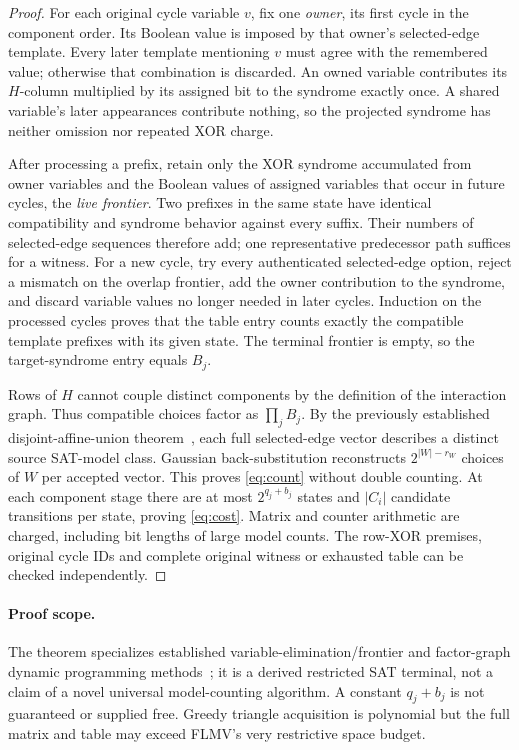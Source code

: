 \documentclass[11pt]{article}
\begin{document}
\begin{proof}
For each original cycle variable $v$, fix one \emph{owner}, its first cycle in the component order. Its Boolean value is imposed by that owner's selected-edge template. Every later template mentioning $v$ must agree with the remembered value; otherwise that combination is discarded. An owned variable contributes its $H$-column multiplied by its assigned bit to the syndrome exactly once. A shared variable's later appearances contribute nothing, so the projected syndrome has neither omission nor repeated XOR charge.

After processing a prefix, retain only the XOR syndrome accumulated from owner variables and the Boolean values of assigned variables that occur in future cycles, the \emph{live frontier}. Two prefixes in the same state have identical compatibility and syndrome behavior against every suffix. Their numbers of selected-edge sequences therefore add; one representative predecessor path suffices for a witness. For a new cycle, try every authenticated selected-edge option, reject a mismatch on the overlap frontier, add the owner contribution to the syndrome, and discard variable values no longer needed in later cycles. Induction on the processed cycles proves that the table entry counts exactly the compatible template prefixes with its given state. The terminal frontier is empty, so the target-syndrome entry equals $B_j$.

Rows of $H$ cannot couple distinct components by the definition of the interaction graph. Thus compatible choices factor as $\prod_jB_j$. By the previously established disjoint-affine-union theorem~\cite{pnpterminal}, each full selected-edge vector describes a distinct source SAT-model class. Gaussian back-substitution reconstructs $2^{|W|-r_W}$ choices of $W$ per accepted vector. This proves \eqref{eq:count} without double counting. At each component stage there are at most $2^{q_j+b_j}$ states and $|C_i|$ candidate transitions per state, proving \eqref{eq:cost}. Matrix and counter arithmetic are charged, including bit lengths of large model counts. The row-XOR premises, original cycle IDs and complete original witness or exhausted table can be checked independently.\end{proof}

\paragraph{Proof scope.} The theorem specializes established variable-elimination/frontier and factor-graph dynamic programming methods~\cite{kschischang2001}; it is a derived restricted SAT terminal, not a claim of a novel universal model-counting algorithm. A constant $q_j+b_j$ is not guaranteed or supplied free. Greedy triangle acquisition is polynomial but the full matrix and table may exceed FLMV's very restrictive space budget.
\end{document}
